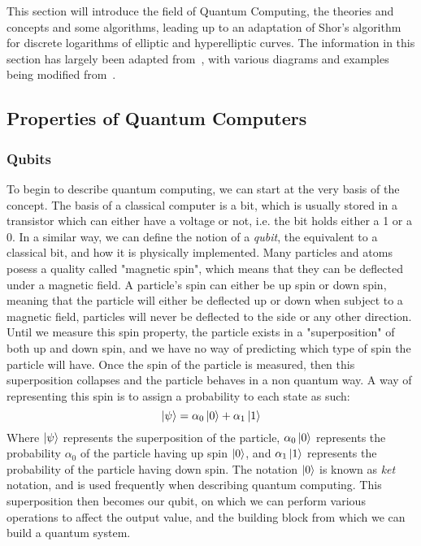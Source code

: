 This section will introduce the field of Quantum Computing, the theories and concepts and some algorithms, leading up to an adaptation of Shor's algorithm for discrete logarithms of elliptic and hyperelliptic curves. The information in this section has largely been adapted from~\cite{quantumslides}, with various diagrams and examples being modified from~\cite{nielsen2002quantum}.
\subsection{Properties of Quantum Computers}
\subsubsection{Qubits}
To begin to describe quantum computing, we can start at the very basis of the concept. The basis of a classical computer is a bit, which is usually stored in a transistor which can either have a voltage or not, i.e. the bit holds either a 1 or a 0. In a similar way, we can define the notion of a \emph{qubit}, the equivalent to a classical bit, and how it is physically implemented. Many particles and atoms posess a quality called "magnetic spin", which means that they can be deflected under a magnetic field. A particle's spin can either be up spin or down spin, meaning that the particle will either be deflected up or down when subject to a magnetic field, particles will never be deflected to the side or any other direction. Until we measure this spin property, the particle exists in a "superposition" of both up and down spin, and we have no way of predicting which type of spin the particle will have. Once the spin of the particle is measured, then this superposition collapses and the particle behaves in a non quantum way. A way of representing this spin is to assign a probability to each state as such: $$\ket{\psi} = \alpha_0\ket{0} + \alpha_1\ket{1}$$ Where $\ket{\psi}$ represents the superposition of the particle, $\alpha_0\ket{0}$ represents the probability $\alpha_0$ of the particle having up spin $\ket{0}$, and $\alpha_1\ket{1}$ represents the probability of the particle having down spin. The notation $\ket{0}$ is known as \emph{ket} notation, and is used frequently when describing quantum computing. This superposition then becomes our qubit, on which we can perform various operations to affect the output value, and the building block from which we can build a quantum system.
